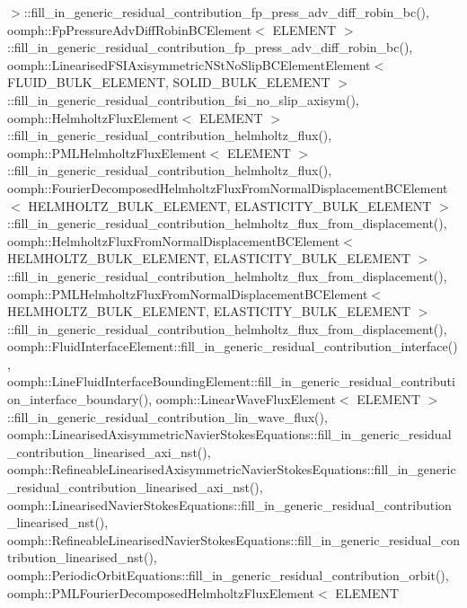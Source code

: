 $>$\+::fill\+\_\+in\+\_\+generic\+\_\+residual\+\_\+contribution\+\_\+fp\+\_\+press\+\_\+adv\+\_\+diff\+\_\+robin\+\_\+bc(), oomph\+::\+Fp\+Pressure\+Adv\+Diff\+Robin\+B\+C\+Element$<$ E\+L\+E\+M\+E\+N\+T $>$\+::fill\+\_\+in\+\_\+generic\+\_\+residual\+\_\+contribution\+\_\+fp\+\_\+press\+\_\+adv\+\_\+diff\+\_\+robin\+\_\+bc(), oomph\+::\+Linearised\+F\+S\+I\+Axisymmetric\+N\+St\+No\+Slip\+B\+C\+Element\+Element$<$ F\+L\+U\+I\+D\+\_\+\+B\+U\+L\+K\+\_\+\+E\+L\+E\+M\+E\+N\+T, S\+O\+L\+I\+D\+\_\+\+B\+U\+L\+K\+\_\+\+E\+L\+E\+M\+E\+N\+T $>$\+::fill\+\_\+in\+\_\+generic\+\_\+residual\+\_\+contribution\+\_\+fsi\+\_\+no\+\_\+slip\+\_\+axisym(), oomph\+::\+Helmholtz\+Flux\+Element$<$ E\+L\+E\+M\+E\+N\+T $>$\+::fill\+\_\+in\+\_\+generic\+\_\+residual\+\_\+contribution\+\_\+helmholtz\+\_\+flux(), oomph\+::\+P\+M\+L\+Helmholtz\+Flux\+Element$<$ E\+L\+E\+M\+E\+N\+T $>$\+::fill\+\_\+in\+\_\+generic\+\_\+residual\+\_\+contribution\+\_\+helmholtz\+\_\+flux(), oomph\+::\+Fourier\+Decomposed\+Helmholtz\+Flux\+From\+Normal\+Displacement\+B\+C\+Element$<$ H\+E\+L\+M\+H\+O\+L\+T\+Z\+\_\+\+B\+U\+L\+K\+\_\+\+E\+L\+E\+M\+E\+N\+T, E\+L\+A\+S\+T\+I\+C\+I\+T\+Y\+\_\+\+B\+U\+L\+K\+\_\+\+E\+L\+E\+M\+E\+N\+T $>$\+::fill\+\_\+in\+\_\+generic\+\_\+residual\+\_\+contribution\+\_\+helmholtz\+\_\+flux\+\_\+from\+\_\+displacement(), oomph\+::\+Helmholtz\+Flux\+From\+Normal\+Displacement\+B\+C\+Element$<$ H\+E\+L\+M\+H\+O\+L\+T\+Z\+\_\+\+B\+U\+L\+K\+\_\+\+E\+L\+E\+M\+E\+N\+T, E\+L\+A\+S\+T\+I\+C\+I\+T\+Y\+\_\+\+B\+U\+L\+K\+\_\+\+E\+L\+E\+M\+E\+N\+T $>$\+::fill\+\_\+in\+\_\+generic\+\_\+residual\+\_\+contribution\+\_\+helmholtz\+\_\+flux\+\_\+from\+\_\+displacement(), oomph\+::\+P\+M\+L\+Helmholtz\+Flux\+From\+Normal\+Displacement\+B\+C\+Element$<$ H\+E\+L\+M\+H\+O\+L\+T\+Z\+\_\+\+B\+U\+L\+K\+\_\+\+E\+L\+E\+M\+E\+N\+T, E\+L\+A\+S\+T\+I\+C\+I\+T\+Y\+\_\+\+B\+U\+L\+K\+\_\+\+E\+L\+E\+M\+E\+N\+T $>$\+::fill\+\_\+in\+\_\+generic\+\_\+residual\+\_\+contribution\+\_\+helmholtz\+\_\+flux\+\_\+from\+\_\+displacement(), oomph\+::\+Fluid\+Interface\+Element\+::fill\+\_\+in\+\_\+generic\+\_\+residual\+\_\+contribution\+\_\+interface(), oomph\+::\+Line\+Fluid\+Interface\+Bounding\+Element\+::fill\+\_\+in\+\_\+generic\+\_\+residual\+\_\+contribution\+\_\+interface\+\_\+boundary(), oomph\+::\+Linear\+Wave\+Flux\+Element$<$ E\+L\+E\+M\+E\+N\+T $>$\+::fill\+\_\+in\+\_\+generic\+\_\+residual\+\_\+contribution\+\_\+lin\+\_\+wave\+\_\+flux(), oomph\+::\+Linearised\+Axisymmetric\+Navier\+Stokes\+Equations\+::fill\+\_\+in\+\_\+generic\+\_\+residual\+\_\+contribution\+\_\+linearised\+\_\+axi\+\_\+nst(), oomph\+::\+Refineable\+Linearised\+Axisymmetric\+Navier\+Stokes\+Equations\+::fill\+\_\+in\+\_\+generic\+\_\+residual\+\_\+contribution\+\_\+linearised\+\_\+axi\+\_\+nst(), oomph\+::\+Linearised\+Navier\+Stokes\+Equations\+::fill\+\_\+in\+\_\+generic\+\_\+residual\+\_\+contribution\+\_\+linearised\+\_\+nst(), oomph\+::\+Refineable\+Linearised\+Navier\+Stokes\+Equations\+::fill\+\_\+in\+\_\+generic\+\_\+residual\+\_\+contribution\+\_\+linearised\+\_\+nst(), oomph\+::\+Periodic\+Orbit\+Equations\+::fill\+\_\+in\+\_\+generic\+\_\+residual\+\_\+contribution\+\_\+orbit(), oomph\+::\+P\+M\+L\+Fourier\+Decomposed\+Helmholtz\+Flux\+Element$<$ E\+L\+E\+M\+E\+N\+T 
